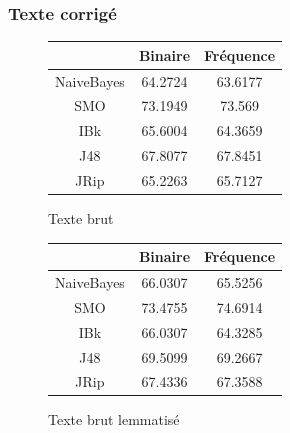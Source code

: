 \documentclass[a4paper, 11pt]{article}
\begin{document}
\subsubsection{Texte corrigé}
\begin{figure}[h]
\begin{minipage}{0.5\textwidth}
\begin{tabular}{|c|c|c|}
\hline
 & Binaire & Fréquence \\
 \hline
 NaiveBayes & 64.2724  & 63.6177 \\
 \hline
 SMO & 73.1949 & 73.569 \\
 \hline
 IBk & 65.6004 & 64.3659 \\
 \hline
 J48 & 67.8077 & 67.8451 \\
 \hline
 JRip & 65.2263 & 65.7127 \\
 \hline
\end{tabular}
\caption{Texte brut}
\end{minipage}
\begin{minipage}{0.5\textwidth}
\begin{tabular}{|c|c|c|}
\hline
 & Binaire & Fréquence \\
 \hline
 NaiveBayes & 66.0307 & 65.5256 \\
 \hline
 SMO & 73.4755 & 74.6914 \\
 \hline
 IBk & 66.0307 & 64.3285 \\
 \hline
 J48 & 69.5099 & 69.2667 \\
 \hline
 JRip & 67.4336 & 67.3588 \\
 \hline
\end{tabular}
\caption{Texte brut lemmatisé}
\end{minipage}
\end{figure}
\newpage
\end{document}
